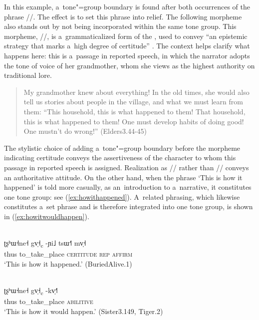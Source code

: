 In this example, a~tone"=group boundary is found after both occurrences of the phrase //. The effect is to set this phrase into relief. The following morpheme also stands out by not being incorporated within the same tone group. This morpheme, //, is a~grammaticalized form of the , used to convey “an epistemic strategy that marks a~high degree of certitude” \citep[497]{lidz2010}. The context helps clarify what happens here: this is a~passage in reported speech, in which the narrator adopts the tone of voice of her grandmother, whom she views as the highest authority on traditional lore. 

\begin{quotation}
	My grandmother knew about everything! In the old times, she would also tell us stories about people in the village, and what we
	must learn from them: “This household, this is what happened to them! That household, this is
	what happened to them! One must develop habits of doing
	good! One mustn’t do wrong!” (Elders3.44-45) 
\end{quotation}

The stylistic choice of adding a~tone"=group boundary before the morpheme indicating {certitude} conveys the assertiveness of the character to whom this passage in reported speech is assigned. Realization as // rather than //
conveys an authoritative attitude. On the other hand, when the phrase ‘This is how it happened’ is told more casually, as
an~introduction to a~narrative, it constitutes one tone group: see (\ref{ex:howithappened}). A~related {phrasing}, which likewise constitutes a~set phrase and is therefore integrated into
one tone group, is shown in (\ref{ex:howitwouldhappen}).

\begin{exe}
	\ex
	\label{ex:howithappened}
	\\
	\gll ʈʂʰɯ˧ne˧	gv̩˧\textsubscript{c}		-ɲi˩		tsɯ˧˥	mv̩˧\\
	thus		to\_take\_place		\textsc{certitude}	 \textsc{rep}		\textsc{affirm}\\
	\glt ‘This is how it happened.’ (BuriedAlive.1)
\end{exe}

\begin{exe}
	\ex
	\label{ex:howitwouldhappen}
	\\
	\gll ʈʂʰɯ˧ne˧	gv̩˧\textsubscript{c}		-kv̩˧˥\\
	thus		to\_take\_place		\textsc{abilitive}\\
	\glt ‘This is how it would happen.’ (Sister3.149, Tiger.2)
\end{exe}

